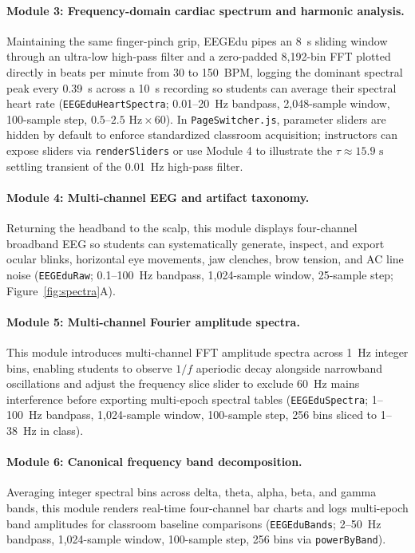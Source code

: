 \documentclass[11pt,letterpaper]{article}
\begin{document}
\paragraph{Module 3: Frequency-domain cardiac spectrum and harmonic analysis.} Maintaining the same finger-pinch grip, EEGEdu pipes an 8~s sliding window through an ultra-low high-pass filter and a zero-padded 8,192-bin FFT plotted directly in beats per minute from 30 to 150~BPM, logging the dominant spectral peak every 0.39~s across a 10~s recording so students can average their spectral heart rate (\texttt{EEGEduHeartSpectra}; 0.01--20~Hz bandpass, 2,048-sample window, 100-sample step, $0.5\text{--}2.5\text{ Hz} \times 60$). In \texttt{PageSwitcher.js}, parameter sliders are hidden by default to enforce standardized classroom acquisition; instructors can expose sliders via \texttt{renderSliders} or use Module 4 to illustrate the $\tau \approx 15.9\text{ s}$ settling transient of the 0.01~Hz high-pass filter.

\paragraph{Module 4: Multi-channel EEG and artifact taxonomy.} Returning the headband to the scalp, this module displays four-channel broadband EEG so students can systematically generate, inspect, and export ocular blinks, horizontal eye movements, jaw clenches, brow tension, and AC line noise (\texttt{EEGEduRaw}; 0.1--100~Hz bandpass, 1,024-sample window, 25-sample step; Figure~\ref{fig:spectra}A).

\paragraph{Module 5: Multi-channel Fourier amplitude spectra.} This module introduces multi-channel FFT amplitude spectra across 1~Hz integer bins, enabling students to observe $1/f$ aperiodic decay alongside narrowband oscillations and adjust the frequency slice slider to exclude 60~Hz mains interference before exporting multi-epoch spectral tables (\texttt{EEGEduSpectra}; 1--100~Hz bandpass, 1,024-sample window, 100-sample step, 256 bins sliced to 1--38~Hz in class).

\paragraph{Module 6: Canonical frequency band decomposition.} Averaging integer spectral bins across delta, theta, alpha, beta, and gamma bands, this module renders real-time four-channel bar charts and logs multi-epoch band amplitudes for classroom baseline comparisons (\texttt{EEGEduBands}; 2--50~Hz bandpass, 1,024-sample window, 100-sample step, 256 bins via \texttt{powerByBand}).
\end{document}
